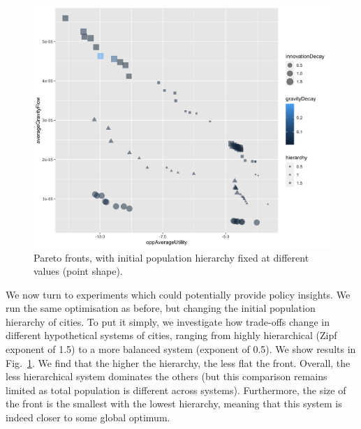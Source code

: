 \documentclass{article}
\begin{document}



\begin{figure}
	\centering
	\includegraphics[width=\linewidth]{figures/pareto-oppAverageUtility-averageGravityFlow_VARYINGHIERARCHY_color-gravityDecay_size-innovationDecay.png}
	\caption{Pareto fronts, with initial population hierarchy fixed at different values (point shape).\label{fig:fig2}}
\end{figure}


We now turn to experiments which could potentially provide policy insights. We run the same optimisation as before, but changing the initial population hierarchy of cities. To put it simply, we investigate how trade-offs change in different hypothetical systems of cities, ranging from highly hierarchical (Zipf exponent of 1.5) to a more balanced system (exponent of 0.5). We show results in Fig.~\ref{fig:fig2}. We find that the higher the hierarchy, the less flat the front. Overall, the less hierarchical system dominates the others (but this comparison remains limited as total population is different across systems). Furthermore, the size of the front is the smallest with the lowest hierarchy, meaning that this system is indeed closer to some global optimum.
\end{document}
